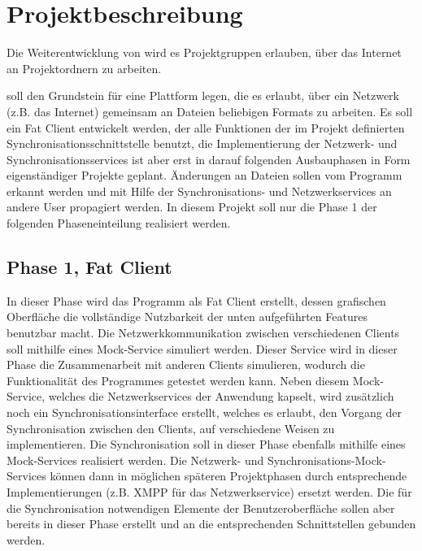 
\section{Projektbeschreibung}
Die Weiterentwicklung von \sepmprojectname wird es Projektgruppen erlauben, über das Internet an Projektordnern zu arbeiten.

\sepmprojectname soll den Grundstein für eine Plattform legen, die es erlaubt, über ein Netzwerk (z.B. das Internet) gemeinsam an Dateien beliebigen Formats zu arbeiten. Es soll ein Fat Client entwickelt werden, der alle Funktionen der im Projekt definierten Synchronisationsschnittstelle benutzt, die Implementierung der Netzwerk- und Synchronisationsservices ist aber erst in darauf folgenden Ausbauphasen in Form eigenständiger Projekte geplant. Änderungen an Dateien sollen vom Programm erkannt werden und mit Hilfe der Synchronisations- und Netzwerkservices an andere User propagiert werden. In diesem Projekt soll nur die Phase 1 der folgenden Phaseneinteilung realisiert werden.

\subsection{Phase 1, Fat Client}
In dieser Phase wird das Programm als Fat Client erstellt, dessen grafischen Oberfläche die vollständige Nutzbarkeit der unten aufgeführten Features benutzbar macht. 
Die Netzwerkkommunikation zwischen verschiedenen Clients soll mithilfe eines Mock-Service simuliert werden. Dieser Service wird in dieser Phase die Zusammenarbeit mit anderen Clients simulieren, wodurch die Funktionalität des Programmes getestet werden kann. Neben diesem Mock-Service, welches die Netzwerkservices der Anwendung kapselt, wird zusätzlich noch ein Synchronisationsinterface erstellt, welches es erlaubt, den Vorgang der Synchronisation zwischen den Clients, auf verschiedene Weisen zu implementieren.
Die Synchronisation soll in dieser Phase ebenfalls mithilfe eines Mock-Services realisiert werden. Die Netzwerk- und Synchronisations-Mock-Services können dann in möglichen späteren Projektphasen durch entsprechende Implementierungen (z.B. XMPP für das Netzwerkservice) ersetzt werden. Die für die Synchronisation notwendigen Elemente der Benutzeroberfläche sollen aber bereits in dieser Phase erstellt und an die entsprechenden Schnittstellen gebunden werden. 

